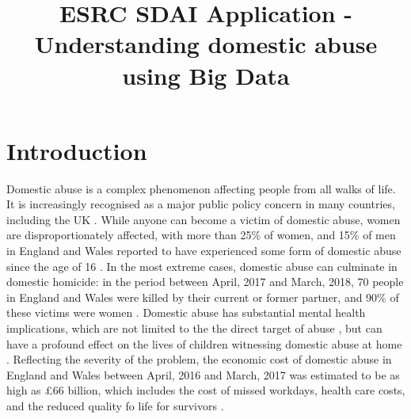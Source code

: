 \documentclass[11pt, a4paper]{article}
\begin{document}
\title{ESRC SDAI Application - Understanding domestic abuse using Big Data}
\date{}
\maketitle

\section{Introduction}

Domestic abuse is a complex phenomenon affecting people from all walks of life. It is increasingly recognised as a major public policy concern in many countries, including the UK \cite{ep}. While anyone can become a victim of domestic abuse, women are disproportionately affected, with more than 25\% of women, and 15\% of men in England and Wales reported to have experienced some form of domestic abuse since the age of 16 \cite{ONS}. In the most extreme cases, domestic abuse can culminate in domestic homicide: in the period between April, 2017 and March, 2018, 70 people in England and Wales were killed by their current or former partner, and 90\% of these victims were women \cite{homic}. Domestic abuse has substantial mental health implications, which are not limited to the the direct target of abuse \cite{ferrari}, but can have a profound effect on the lives of children witnessing domestic abuse at home \cite{callaghan}. Reflecting the severity of the problem, the economic cost of domestic abuse in England and Wales between April, 2016 and March, 2017 was estimated to be as high as \pounds 66 billion, which includes the cost of missed workdays, health care costs, and the reduced quality fo life for survivors \cite{costs}.



\end{document}
